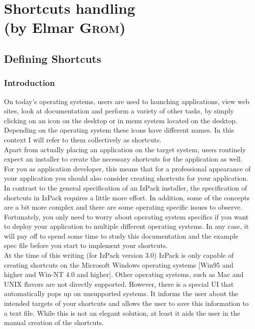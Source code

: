 

\chapter{Shortcuts handling \\
         (by Elmar \textsc{Grom})}

\section{Defining Shortcuts}

\subsection{Introduction}

On today's operating systems, users are used to launching applications,
view web sites, look at documentation and perform a variety of other
tasks, by simply clicking on an icon on the desktop or in menu system
located on the desktop. Depending on the operating system these icons
have different names. In this context I will refer to them collectively
as shortcuts.\\

Apart from actually placing an application on the target system, users
routinely expect an installer to create the necessary shortcuts for the
application as well. For you as application developer, this means that
for a professional appearance of your application you should also
consider creating shortcuts for your application.\\

In contrast to the general specification of an IzPack installer, the
specification of shortcuts in IzPack requires a little more effort. In
addition, some of the concepts are a bit more complex and there are some
operating specific issues to observe. Fortunately, you only need to
worry about operating system specifics if you want to deploy your
application to multiple different operating systems. In any case, it
will pay off to spend some time to study this documentation and the
example spec file before you start to implement your shortcuts.\\

At the time of this writing (for IzPack version 3.0) IzPack is only
capable of creating shortcuts on the Microsoft Windows operating systems
[Win95 and higher and Win-NT 4.0 and higher]. Other operating systems,
such as Mac and UNIX flavors are not directly supported. However, there
is a special UI that automatically pops up on unsupported systems. It
informs the user about the intended targets of your shortcuts and allows
the user to save this information to a text file. While this is not an
elegant solution, at least it aids the user in the manual creation of
the shortcuts.\\

